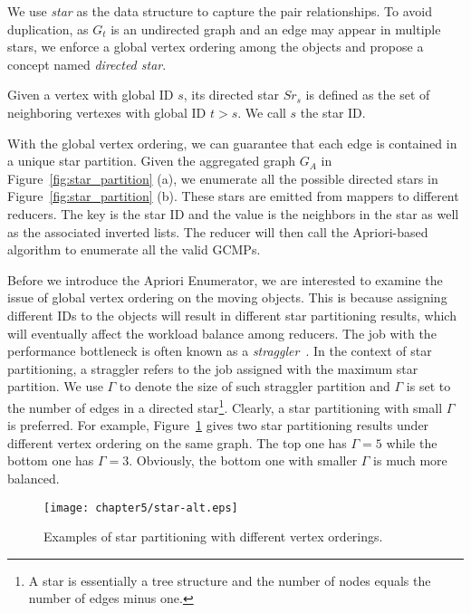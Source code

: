 We use \emph{star} as the data structure to capture the pair relationships. 
To avoid duplication, as $G_t$ is an undirected graph and an edge may appear in multiple stars, 
we enforce a global vertex ordering among the objects and propose a concept named \textit{directed star}.

\begin{definition}
Given a vertex with global ID $s$, its directed star $Sr_s$ is defined as the set of neighboring vertexes with global ID $t>s$. We call $s$ the star ID.
\end{definition}

With the global vertex ordering, we can guarantee that each edge is contained in a unique star partition. Given the aggregated graph $G_A$  in Figure~\ref{fig:star_partition} (a), we enumerate all the possible directed stars in Figure~\ref{fig:star_partition} (b). These stars are emitted from mappers to different reducers. The key is the star ID and the value is the neighbors in the star as well as the associated inverted lists. 
The reducer will then call the Apriori-based algorithm to enumerate all the valid GCMPs.


Before we introduce the Apriori Enumerator, we are interested to 
examine the issue of global vertex ordering on the moving objects.
This is because assigning different IDs to the objects will result in 
different star partitioning results, which will eventually affect the workload 
balance among reducers. The job with the performance bottleneck is often known as a  \emph{straggler}~\cite{kwon2012skewtune,coppa2015data}. In the context of star partitioning, a straggler refers to the job assigned with the maximum star partition. We use $\Gamma$ to denote the size of such straggler partition and $\Gamma$ is set to the number of edges in a directed star\footnote{A star is essentially a tree structure and the number of nodes equals the number of edges minus one.}. Clearly, a star partitioning with small $\Gamma$ is preferred. For example, Figure~\ref{fig:star-alt} gives two star partitioning results under 
different vertex ordering on the same graph. The top one has $\Gamma = 5$ while the bottom one has $\Gamma = 3$. Obviously, the bottom one with smaller $\Gamma$ is much more balanced.

\begin{figure}[h]
\centering
\texttt{[image: chapter5/star-alt.eps]}
\caption{Examples of star partitioning with different vertex orderings.}
\label{fig:star-alt}
\end{figure}

